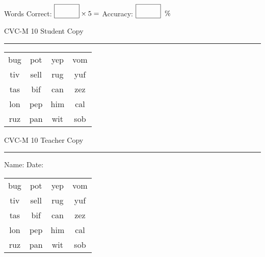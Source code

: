 \documentclass{memoir}
\begin{document}
\small

Words Correct: $\fbox{\phantom{\huge 100}} \times 5 = $ Accuracy: $\fbox{\phantom{\huge 100}}\;\; \%$ 

\vfill

\newpage


\footnotesize \noindent
CVC-M 10 \hfill Student Copy
\smallskip
\hrule

\Large

\setlength{\tabcolsep}{14pt}
\def\arraystretch{2}

{\selectfont


\begin{vplace}[0.5]
\begin{center}
\begin{tabular}{cccc}
bug & pot & yep & vom \\
tiv & sell & rug & yuf \\
tas & bif & can & zez \\
lon & pep & him & cal \\
ruz & pan & wit & sob \\
\end{tabular}
\end{center}
\end{vplace}

}

\newpage

\footnotesize \noindent
CVC-M 10 \hfill Teacher Copy
\smallskip
\hrule

\small

\vfill

\noindent
Name: \underline{\hspace{1.75in}} \hfill Date: \underline{\hspace{1in}}

\Large

{\selectfont


\begin{vplace}[0.5]
\begin{center}
\begin{tabular}{cccc}
bug & pot & yep & vom \\
tiv & sell & rug & yuf \\
tas & bif & can & zez \\
lon & pep & him & cal \\
ruz & pan & wit & sob \\
\end{tabular}
\end{center}
\end{vplace}



}
\end{document}

